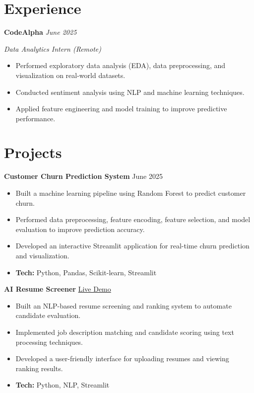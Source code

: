 \documentclass[letterpaper,11pt]{article}
\begin{document}
\section{Experience}

\textbf{CodeAlpha}
\hfill
\textit{June 2025}

\textit{Data Analytics Intern (Remote)}

\begin{itemize}[leftmargin=1.2em,noitemsep,topsep=1pt]
\item Performed exploratory data analysis (EDA), data preprocessing, and visualization on real-world datasets.
\item Conducted sentiment analysis using NLP and machine learning techniques.
\item Applied feature engineering and model training to improve predictive performance.
\end{itemize}

\section{Projects}

\textbf{Customer Churn Prediction System}
\hfill
June 2025

\begin{itemize}[leftmargin=1.2em,noitemsep,topsep=1pt]
\item Built a machine learning pipeline using Random Forest to predict customer churn.
\item Performed data preprocessing, feature encoding, feature selection, and model evaluation to improve prediction accuracy.
\item Developed an interactive Streamlit application for real-time churn prediction and visualization.
\item \textbf{Tech:} Python, Pandas, Scikit-learn, Streamlit
\end{itemize}

\vspace{2pt}

\textbf{AI Resume Screener}
\hfill
\href{https://neeharika921.github.io/RESUME_SCREENER/}{Live Demo}

\begin{itemize}[leftmargin=1.2em,noitemsep,topsep=1pt]
\item Built an NLP-based resume screening and ranking system to automate candidate evaluation.
\item Implemented job description matching and candidate scoring using text processing techniques.
\item Developed a user-friendly interface for uploading resumes and viewing ranking results.
\item \textbf{Tech:} Python, NLP, Streamlit
\end{itemize}
\end{document}
